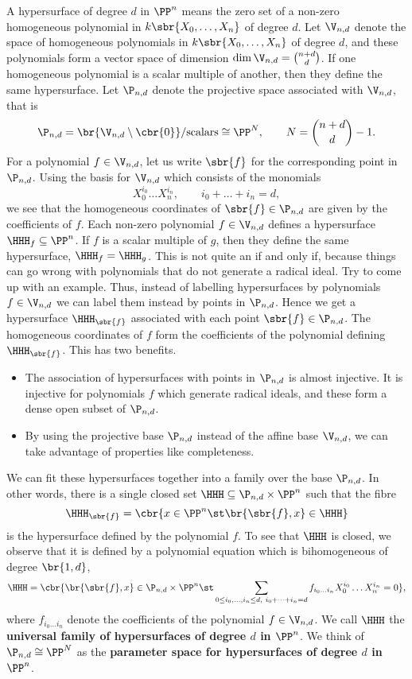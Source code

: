 \begin{example*}
A hypersurface of degree $ d $ in $ \PP^n $ means the zero set of a non-zero homogeneous polynomial in $ k\sbr{X_0, \dots, X_n} $ of degree $ d $. Let $ \V_{n, d} $ denote the space of homogeneous polynomials in $ k\sbr{X_0, \dots, X_n} $ of degree $ d $, and these polynomials form a vector space of dimension $ \dim \V_{n, d} = \binom{n + d}{d} $. If one homogeneous polynomial is a scalar multiple of another, then they define the same hypersurface. Let $ \P_{n, d} $ denote the projective space associated with $ \V_{n, d} $, that is
$$ \P_{n, d} = \br{\V_{n, d} \setminus \cbr{0}} / \text{scalars} \cong \PP^N, \qquad N = \binom{n + d}{d} - 1. $$
For a polynomial $ f \in \V_{n, d} $, let us write $ \sbr{f} $ for the corresponding point in $ \P_{n, d} $. Using the basis for $ \V_{n, d} $ which consists of the monomials
$$ X_0^{i_0} \dots X_n^{i_n}, \qquad i_0 + \dots + i_n = d, $$
we see that the homogeneous coordinates of $ \sbr{f} \in \P_{n, d} $ are given by the coefficients of $ f $. Each non-zero polynomial $ f \in \V_{n, d} $ defines a hypersurface $ \HHH_f \subseteq \PP^n $. If $ f $ is a scalar multiple of $ g $, then they define the same hypersurface, $ \HHH_f = \HHH_g $. This is not quite an if and only if, because things can go wrong with polynomials that do not generate a radical ideal. Try to come up with an example. Thus, instead of labelling hypersurfaces by polynomials $ f \in \V_{n, d} $ we can label them instead by points in $ \P_{n, d} $. Hence we get a hypersurface $ \HHH_{\sbr{f}} $ associated with each point $ \sbr{f} \in \P_{n, d} $. The homogeneous coordinates of $ f $ form the coefficients of the polynomial defining $ \HHH_{\sbr{f}} $. This has two benefits.
\begin{itemize}
\item The association of hypersurfaces with points in $ \P_{n, d} $ is almost injective. It is injective for polynomials $ f $ which generate radical ideals, and these form a dense open subset of $ \P_{n, d} $.
\item By using the projective base $ \P_{n, d} $ instead of the affine base $ \V_{n, d} $, we can take advantage of properties like completeness.
\end{itemize}
We can fit these hypersurfaces together into a family over the base $ \P_{n, d} $. In other words, there is a single closed set $ \HHH \subseteq \P_{n, d} \times \PP^n $ such that the fibre
$$ \HHH_{\sbr{f}} = \cbr{x \in \PP^n \st \br{\sbr{f}, x} \in \HHH} $$
is the hypersurface defined by the polynomial $ f $. To see that $ \HHH $ is closed, we observe that it is defined by a polynomial equation which is bihomogeneous of degree $ \br{1, d} $,
$$ \HHH = \cbr{\br{\sbr{f}, x} \in \P_{n, d} \times \PP^n \st \sum_{0 \le i_0, \dots, i_n \le d, \ i_0 + \dots + i_n = d} f_{i_0 \dots i_n}X_0^{i_0} \dots X_n^{i_n} = 0}, $$
where $ f_{i_0 \dots i_n} $ denote the coefficients of the polynomial $ f \in \V_{n, d} $. We call $ \HHH $ the \textbf{universal family of hypersurfaces of degree $ d $ in $ \PP^n $}. We think of $ \P_{n, d} \cong \PP^N $ as the \textbf{parameter space for hypersurfaces of degree $ d $ in $ \PP^n $}.
\end{example*}

